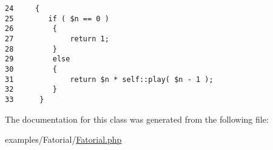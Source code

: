 \begin{Code}\begin{verbatim}24     {
25        if ( $n == 0 )
26         {
27             return 1;
28         }
29         else
30         {
31             return $n * self::play( $n - 1 );
32         }
33      }
\end{verbatim}
\end{Code}




The documentation for this class was generated from the following file:\begin{CompactItemize}
\item 
examples/Fatorial/\hyperlink{_fatorial_8php}{Fatorial.php}\end{CompactItemize}
